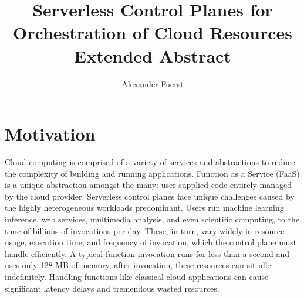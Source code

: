 \documentclass[pageno]{jpaper}
\begin{document}


\title{Serverless Control Planes for Orchestration of Cloud Resources \\ \textbf{Extended Abstract}}
\author{Alexander Fuerst}

\date{}

\begin{comment}
The SPEC Research Group promotes research in quantitative system evaluation and analysis
both with classical performance metrics – such as response time, throughput, scalability and efficiency,
as well as other extra-functional system properties included under the term dependability – 
such as availability, reliability, and security. Contributions of interest span the design of metrics
for system evaluation as well as the development of methodologies, techniques and tools for
measurement, load testing, profiling, workload characterization, dependability and efficiency evaluation of computing systems.

A separate one-page extended abstract. 
You can take the current abstract and add a few more sentences about the technical novelty, results, etc., 
since this will be for a performance-engineering audience  
\end{comment}

\maketitle

\thispagestyle{empty}

\section{Motivation}


Cloud computing is comprised of a variety of services and abstractions to reduce the complexity of building and running applications.
Function as a Service (FaaS) is a unique abstraction amongst the many: user supplied code entirely managed by the cloud provider.
Serverless control planes face unique challenges caused by the highly heterogeneous workloads predominant.
Users run machine learning inference, web services, multimedia analysis, and even scientific computing, to the tune of billions of invocations per day.
These, in turn, vary widely in resource usage, execution time, and frequency of invocation, which the control plane must handle efficiently.
A typical function invocation runs for less than a second and uses only 128 MB of memory, after invocation, these resources can sit idle indefinitely.
Handling functions like classical cloud applications can cause significant latency delays and tremendous wasted resources.
\end{document}
